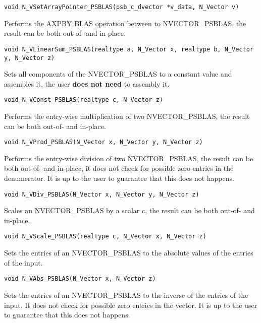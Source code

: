 \documentclass[twoside,a4paper]{refart}
\begin{document}
\begin{description}
 	 \lstinline[style=CStyle]|void N_VSetArrayPointer_PSBLAS(psb_c_dvector *v_data, N_Vector v)|
 	
 	\item[\fbox{\texttt{N\_VLinearSum\_PSBLAS}}] Performs the AXPBY BLAS operation between to  NVECTOR\_PSBLAS, the result can be both out-of- and in-place.
 	
 	 \lstinline[style=CStyle]|void N_VLinearSum_PSBLAS(realtype a, N_Vector x, realtype b, N_Vector y, N_Vector z)|
 	
 	\item[\fbox{\texttt{N\_VConst\_PSBLAS}}] Sets all components of the NVECTOR\_PSBLAS to a constant value and assembles it, the user \textbf{does not need} to assembly it.
 	
 	 \lstinline[style=CStyle]|void N_VConst_PSBLAS(realtype c, N_Vector z)|
 	
 	\item[\fbox{\texttt{N\_VProd\_PSBLAS}}] Performs the entry-wise multiplication of two NVECTOR\_PSBLAS, the result can be both out-of- and in-place.
 	
 	 \lstinline[style=CStyle]|void N_VProd_PSBLAS(N_Vector x, N_Vector y, N_Vector z)|
 	
 	\item[\fbox{\texttt{N\_VDiv\_PSBLAS}}] Performs the entry-wise division of two NVECTOR\_PSBLAS, the result can be both out-of- and in-place, it does not check for possible zero entries in the denumerator. It is up to the user to guarantee that this does not happens.
 	
 	 \lstinline[style=CStyle]|void N_VDiv_PSBLAS(N_Vector x, N_Vector y, N_Vector z)|
 	
 	\item[\fbox{\texttt{N\_VScale\_PSBLAS}}] Scales an NVECTOR\_PSBLAS by a scalar c, the result can be both out-of- and in-place.
 	 
 	 \lstinline[style=CStyle]|void N_VScale_PSBLAS(realtype c, N_Vector x, N_Vector z)|
 	
 	\item[\fbox{\texttt{N\_VAbs\_PSBLAS}}] Sets the entries of an NVECTOR\_PSBLAS to the absolute values of the entries of the input.
 	
 	 \lstinline[style=CStyle]|void N_VAbs_PSBLAS(N_Vector x, N_Vector z)|
 	
 	\item[\fbox{\texttt{N\_VInv\_PSBLAS}}] Sets the entries of an NVECTOR\_PSBLAS to the inverse of the entries of the input. It does not check for possible zero entries in the vector. It is up to the user to guarantee that this does not happens.
 	

\end{description}
\end{document}
